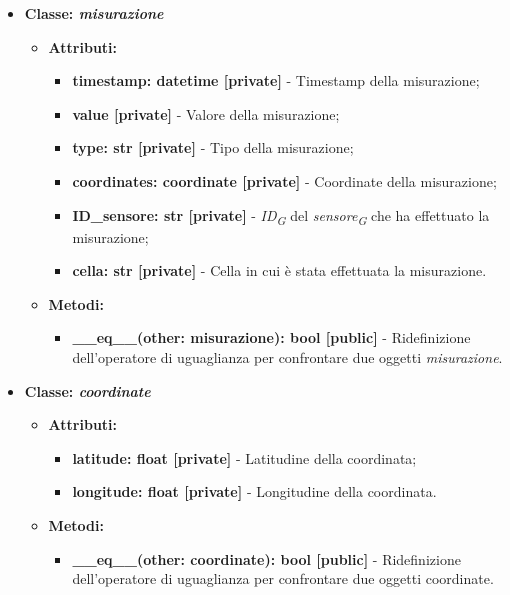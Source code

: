 \begin{itemize}
    \item\textbf{Classe: \textit{misurazione}}
    \begin{itemize}
        \item \textbf{Attributi:} 
    \begin{itemize}
        \item \textbf{timestamp: datetime [private]} - Timestamp della misurazione;
        \item \textbf{value [private]} - Valore della misurazione;
        \item \textbf{type: str [private]} - Tipo della misurazione;
        \item \textbf{coordinates: coordinate [private]} - Coordinate della misurazione;
        \item \textbf{ID\_sensore: str [private]} - \textit{ID}\textsubscript{\textit{G}} del \textit{sensore}\textsubscript{\textit{G}} che ha effettuato la misurazione;
        \item \textbf{cella: str [private]} - Cella in cui è stata effettuata la misurazione.
    \end{itemize}
    \item \textbf{Metodi:} 
    \begin{itemize}
        \item \textbf{\_\_eq\_\_(other: misurazione): bool [public]} - Ridefinizione dell'operatore di uguaglianza per confrontare due oggetti \textit{misurazione}.
    \end{itemize}
\end{itemize}

    \item\textbf{Classe: \textit{coordinate}}
    \begin{itemize}
        \item \textbf{Attributi:} 
    \begin{itemize}
        \item \textbf{latitude: float [private]} - Latitudine della coordinata;
        \item \textbf{longitude: float [private]} - Longitudine della coordinata.
    \end{itemize}
    \item     \textbf{Metodi:} 
    \begin{itemize}
        \item \textbf{\_\_eq\_\_(other: coordinate): bool [public]} - Ridefinizione dell'operatore di uguaglianza per confrontare due oggetti coordinate.
    \end{itemize}
\end{itemize}


\end{itemize}
